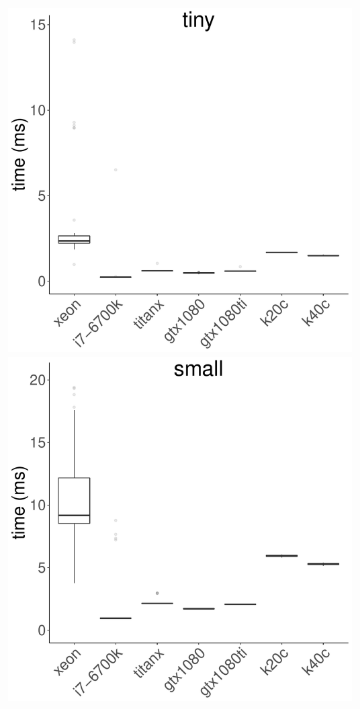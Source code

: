 \documentclass[../document.tex]{subfiles}
\begin{document}
\begin{figure}
	\begin{subfigure}{0.09\textwidth} \label{fig:time-lud} \vspace{5mm}\end{subfigure}
	\begin{subfigure}{0.9\textwidth}
		\includegraphics[width=\plotwidth]{figures/time-results/generate_lud_tiny_boxplot-1}
		\includegraphics[width=\plotwidth]{figures/time-results/generate_lud_small_boxplot-1}

\end{subfigure}
\end{figure}
\end{document}
